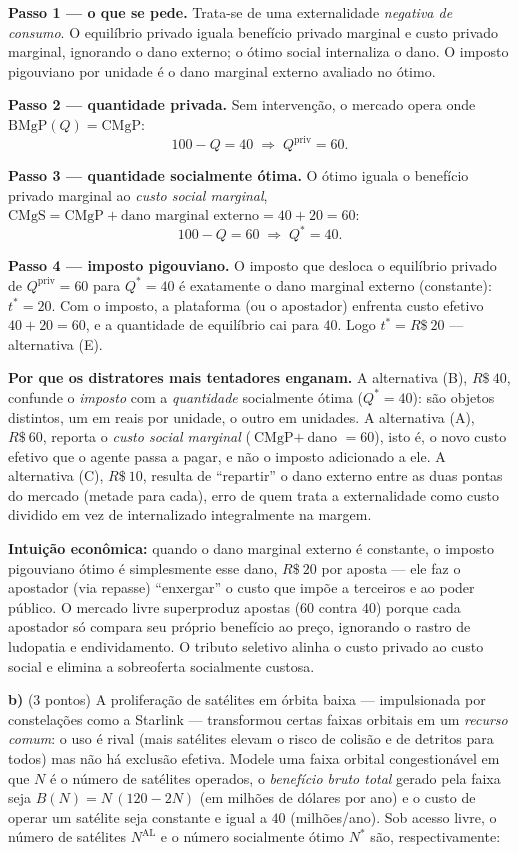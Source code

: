 \begin{solucao}
\textbf{Passo 1 --- o que se pede.} Trata-se de uma externalidade \emph{negativa de consumo}. O equilíbrio privado iguala benefício privado marginal e custo privado marginal, ignorando o dano externo; o ótimo social internaliza o dano. O imposto pigouviano por unidade é o dano marginal externo avaliado no ótimo.

\textbf{Passo 2 --- quantidade privada.} Sem intervenção, o mercado opera onde $\text{BMgP}(Q)=\text{CMgP}$:
\[
100-Q=40\;\Longrightarrow\; Q^{\text{priv}}=60.
\]

\textbf{Passo 3 --- quantidade socialmente ótima.} O ótimo iguala o benefício privado marginal ao \emph{custo social marginal}, $\text{CMgS}=\text{CMgP}+\text{dano marginal externo}=40+20=60$:
\[
100-Q=60\;\Longrightarrow\; Q^{*}=40.
\]

\textbf{Passo 4 --- imposto pigouviano.} O imposto que desloca o equilíbrio privado de $Q^{\text{priv}}=60$ para $Q^{*}=40$ é exatamente o dano marginal externo (constante): $t^{*}=20$. Com o imposto, a plataforma (ou o apostador) enfrenta custo efetivo $40+20=60$, e a quantidade de equilíbrio cai para $40$. Logo $t^{*}=R\$~20$ --- alternativa (E).

\textbf{Por que os distratores mais tentadores enganam.} A alternativa (B), $R\$~40$, confunde o \emph{imposto} com a \emph{quantidade} socialmente ótima ($Q^{*}=40$): são objetos distintos, um em reais por unidade, o outro em unidades. A alternativa (A), $R\$~60$, reporta o \emph{custo social marginal} ($\text{CMgP}+$dano $=60$), isto é, o novo custo efetivo que o agente passa a pagar, e não o imposto adicionado a ele. A alternativa (C), $R\$~10$, resulta de ``repartir'' o dano externo entre as duas pontas do mercado (metade para cada), erro de quem trata a externalidade como custo dividido em vez de internalizado integralmente na margem.

\textbf{Intuição econômica:} quando o dano marginal externo é constante, o imposto pigouviano ótimo é simplesmente esse dano, $R\$~20$ por aposta --- ele faz o apostador (via repasse) ``enxergar'' o custo que impõe a terceiros e ao poder público. O mercado livre superproduz apostas ($60$ contra $40$) porque cada apostador só compara seu próprio benefício ao preço, ignorando o rastro de ludopatia e endividamento. O tributo seletivo alinha o custo privado ao custo social e elimina a sobreoferta socialmente custosa.
\end{solucao}

\textbf{b)} (3 pontos) A proliferação de satélites em \'orbita baixa --- impulsionada por constela\c{c}\~oes como a Starlink --- transformou certas faixas orbitais em um \emph{recurso comum}: o uso é rival (mais satélites elevam o risco de colisão e de detritos para todos) mas não há exclusão efetiva. Modele uma faixa orbital congestionável em que $N$ é o número de satélites operados, o \emph{benefício bruto total} gerado pela faixa seja $B(N)=N\,(120-2N)$ (em milhões de dólares por ano) e o custo de operar um satélite seja constante e igual a $40$ (milhões/ano). Sob acesso livre, o número de satélites $N^{\text{AL}}$ e o número socialmente ótimo $N^{*}$ são, respectivamente:

